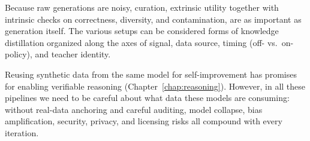 Because raw generations are noisy, curation, extrinsic utility together with intrinsic checks on correctness, diversity, and contamination, are as important as generation itself. The various setups can be considered forms of knowledge distillation organized along the axes of signal, data source, timing (off- vs.\ on-policy), and teacher identity. 

Reusing synthetic data from the same model for self-improvement has promises for enabling verifiable reasoning (Chapter~\ref{chap:reasoning}). However, in all these pipelines we need to be careful about what data these models are consuming: without real-data anchoring and careful auditing, model collapse, bias amplification, security, privacy, and licensing risks all compound with every iteration.




